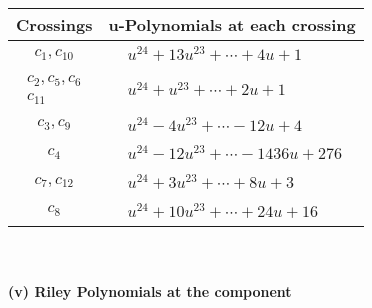 \documentclass[1p]{elsarticle_modified}
\theoremstyle{definition}
\begin{document}
\begin{tabular}{m{50pt}|m{274pt}}
Crossings & \hspace{64pt}u-Polynomials at each crossing \\
\hline $$\begin{aligned}c_{1},c_{10}\end{aligned}$$&$\begin{aligned}
&u^{24}+13 u^{23}+\cdots+4 u+1
\end{aligned}$\\
\hline $$\begin{aligned}c_{2},c_{5},c_{6}\\c_{11}\end{aligned}$$&$\begin{aligned}
&u^{24}+u^{23}+\cdots+2 u+1
\end{aligned}$\\
\hline $$\begin{aligned}c_{3},c_{9}\end{aligned}$$&$\begin{aligned}
&u^{24}-4 u^{23}+\cdots-12 u+4
\end{aligned}$\\
\hline $$\begin{aligned}c_{4}\end{aligned}$$&$\begin{aligned}
&u^{24}-12 u^{23}+\cdots-1436 u+276
\end{aligned}$\\
\hline $$\begin{aligned}c_{7},c_{12}\end{aligned}$$&$\begin{aligned}
&u^{24}+3 u^{23}+\cdots+8 u+3
\end{aligned}$\\
\hline $$\begin{aligned}c_{8}\end{aligned}$$&$\begin{aligned}
&u^{24}+10 u^{23}+\cdots+24 u+16
\end{aligned}$\\
\hline
\end{tabular}\\~\\
\newpage\renewcommand{\arraystretch}{1}
\flushleft \textbf{(v) Riley Polynomials at the component}\newline \\
\end{document}
